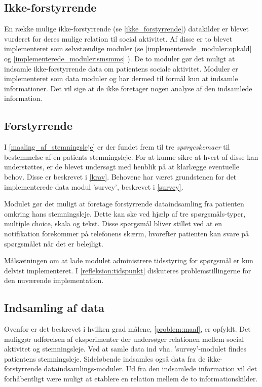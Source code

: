 \subsection{Ikke-forstyrrende}
En række mulige ikke-forstyrrende (se \cref{ikke_forstyrrende}) datakilder er blevet vurderet for deres mulige relation til social aktivitet.
Af disse er to blevet implementeret som selvstændige moduler (se \cref{implementerede_moduler:opkald}  og \cref{implementerede_moduler:smsmms} ).
De to moduler gør det muligt at indsamle ikke-forstyrrende data om patientens sociale aktivitet.
Moduler er implementeret som data moduler og har dermed til formål kun at indsamle informationer.
Det vil sige at de ikke foretager nogen analyse af den indsamlede information.

\subsection{Forstyrrende}
I \cref{maaling_af_stemningsleje} er der fundet frem til tre \textit{spørgeskemaer} til bestemmelse af en patients stemningsleje.
For at kunne sikre at hvert af disse kan understøttes, er de blevet undersøgt med henblik på at klarlægge eventuelle behov.
Disse er beskrevet i \cref{krav}.
Behovene har været grundstenen for det implementerede data modul 'survey', beskrevet i \cref{survey}.

Modulet gør det muligt at foretage forstyrrende dataindsamling fra patienten omkring hans stemningsleje.
Dette kan ske ved hjælp af tre spørgsmåls-typer, multiple choice, skala og tekst.
Disse spørgsmål bliver stillet ved at en notifikation forekommer på telefonens skærm, hvorefter patienten kan svare på spørgsmålet når det er belejligt.

Målsætningen om at lade modulet administrere tidsstyring for spørgsmål er kun delvist implementeret.
I \cref{refleksion:tidspunkt} diskuteres problemstillingerne for den nuværende implementation.
\subsection{Indsamling af data}
Ovenfor er det beskrevet i hvilken grad målene, \cref{problem:maal}, er opfyldt.
Det muliggør udførelsen af eksperimenter der undersøger relationen mellem social aktivitet og stemningsleje.
Ved at samle data ind vha. 'survey'-modulet findes patientens stemningsleje.
Sideløbende indsamles også data fra de ikke-forstyrrende dataindsamlings-moduler.
Ud fra den indsamlede information vil det forhåbentligt være muligt at etablere en relation mellem de to informationskilder.

